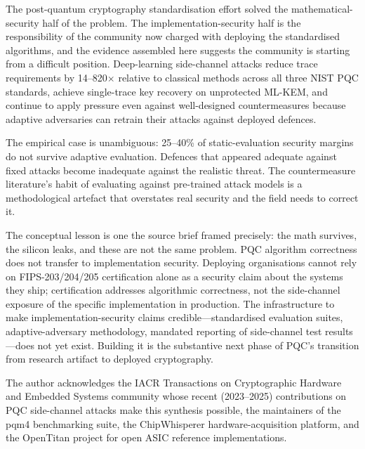 \documentclass[sigconf,nonacm]{acmart}
\begin{document}
The post-quantum cryptography standardisation effort solved the
mathematical-security half of the problem. The implementation-security
half is the responsibility of the community now charged with deploying
the standardised algorithms, and the evidence assembled here suggests
the community is starting from a difficult position. Deep-learning
side-channel attacks reduce trace requirements by 14--820$\times$
relative to classical methods across all three NIST PQC standards,
achieve single-trace key recovery on unprotected ML-KEM, and continue
to apply pressure even against well-designed countermeasures because
adaptive adversaries can retrain their attacks against deployed
defences.

The empirical case is unambiguous: 25--40\% of static-evaluation
security margins do not survive adaptive evaluation. Defences that
appeared adequate against fixed attacks become inadequate against the
realistic threat. The countermeasure literature's habit of evaluating
against pre-trained attack models is a methodological artefact that
overstates real security and the field needs to correct it.

The conceptual lesson is one the source brief framed precisely: the
math survives, the silicon leaks, and these are not the same problem.
PQC algorithm correctness does not transfer to implementation security.
Deploying organisations cannot rely on FIPS-203/204/205 certification
alone as a security claim about the systems they ship; certification
addresses algorithmic correctness, not the side-channel exposure of
the specific implementation in production. The infrastructure to make
implementation-security claims credible---standardised evaluation
suites, adaptive-adversary methodology, mandated reporting of
side-channel test results---does not yet exist. Building it is the
substantive next phase of PQC's transition from research artifact to
deployed cryptography.

\begin{acks}
The author acknowledges the IACR Transactions on Cryptographic
Hardware and Embedded Systems community whose recent (2023--2025)
contributions on PQC side-channel attacks make this synthesis
possible, the maintainers of the pqm4 benchmarking suite, the
ChipWhisperer hardware-acquisition platform, and the OpenTitan
project for open ASIC reference implementations.
\end{acks}
\end{document}
